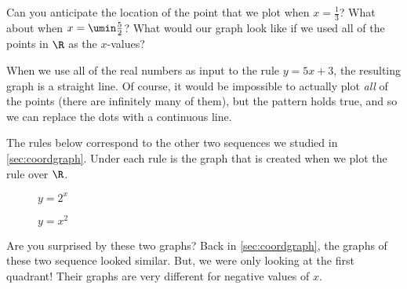 Can you anticipate the location of the point that we plot when $x = \frac{1}{3}$? What about when $x = \umin\frac{5}{2}$? What would our graph look like if we used all of the points in $\R$ as the $x$-values?

When we use all of the real numbers as input to the rule $y = 5x + 3$, the resulting graph is a straight line. Of course, it would be impossible to actually plot \textit{all} of the points (there are infinitely many of them), but the pattern holds true, and so we can replace the dots with a continuous line.

\begin{center}
\end{center}

The rules below correspond to the other two sequences we studied in \cref{sec:coordgraph}. Under each rule is the graph that is created when we plot the rule over $\R$.

\begin{figure}
\begin{minipage}[c]{0.49\textwidth }
	\centering
	$y = 2^x$\par\medskip
\end{minipage}
%
\begin{minipage}[c]{0.49\textwidth }
	\centering
	$y = x^2$\par\medskip
\end{minipage}
\end{figure}

Are you surprised by these two graphs? Back in \cref{sec:coordgraph}, the graphs of these two sequence looked similar. But, we were only looking at the first quadrant! Their graphs are very different for negative values of $x$.

